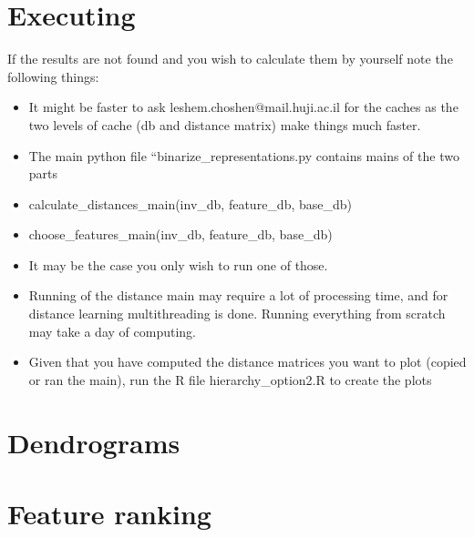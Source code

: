 \documentclass[letterpaper, 11pt]{article}
\begin{document}
\section{Executing}
If the results are not found and you wish to calculate them by yourself note the following things:
\begin{itemize}
	\item It might be faster to ask leshem.choshen@mail.huji.ac.il for the caches as the two levels of cache (db and distance matrix) make things much faster.
	\item  The main python file “binarize\_representations.py contains mains of the two parts
	\item calculate\_distances\_main(inv\_db, feature\_db, base\_db)
	\item choose\_features\_main(inv\_db, feature\_db, base\_db)
	\item  It may be the case you only wish to run one of those.
	\item Running of the distance main may require a lot of processing time, and for distance learning multithreading is done. Running everything from scratch may take a day of computing.
	\item Given that you have computed the distance matrices you want to plot (copied or ran the main), run the R file hierarchy\_option2.R to create the plots
\end{itemize}

\section{Dendrograms}

\section{Feature ranking}




\end{document}

